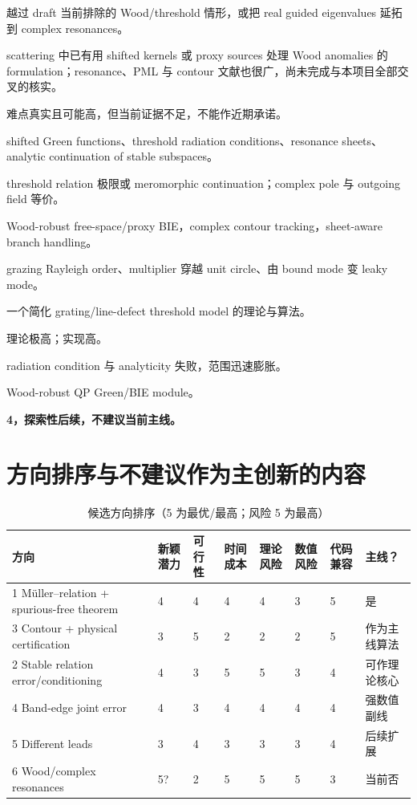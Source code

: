 \documentclass[UTF8,11pt,fontset=none]{ctexart}
\begin{document}
\begin{description}[style=multiline,leftmargin=4.4cm,labelwidth=4.1cm]
  \item[核心问题：] 越过 draft 当前排除的 Wood/threshold 情形，或把 real guided eigenvalues 延拓到 complex resonances。
  \item[差异：] scattering 中已有用 shifted kernels 或 proxy sources 处理 Wood anomalies 的 formulation；resonance、PML 与 contour 文献也很广，尚未完成与本项目全部交叉的核实。
  \item[创新性：] 难点真实且可能高，但当前证据不足，不能作近期承诺。
  \item[继续核实：] shifted Green functions、threshold radiation conditions、resonance sheets、analytic continuation of stable subspaces。
  \item[主要定理：] threshold relation 极限或 meromorphic continuation；complex pole 与 outgoing field 等价。
  \item[算法：] Wood-robust free-space/proxy BIE，complex contour tracking，sheet-aware branch handling。
  \item[实验：] grazing Rayleigh order、multiplier 穿越 unit circle、由 bound mode 变 leaky mode。
  \item[最小单元：] 一个简化 grating/line-defect threshold model 的理论与算法。
  \item[难度：] 理论极高；实现高。
  \item[风险：] radiation condition 与 analyticity 失败，范围迅速膨胀。
  \item[失败时保留：] Wood-robust QP Green/BIE module。
  \item[优先级：] \textbf{4，探索性后续，不建议当前主线。}
\end{description}

\section{方向排序与不建议作为主创新的内容}

\begin{table}[htbp]
\centering
\caption{候选方向排序（5 为最优/最高；风险 5 为最高）}
\small
\begin{tabularx}{\textwidth}{p{} C{1.15cm} C{1.15cm} C{1.15cm} C{1.15cm} C{1.15cm} C{1.35cm} Y}
\toprule
方向 & 新颖潜力 & 可行性 & 时间成本 & 理论风险 & 数值风险 & 代码兼容 & 主线？ \\
 Müller--relation + spurious-free theorem & 4 & 4 & 4 & 4 & 3 & 5 & 是 \\
3 Contour + physical certification & 3 & 5 & 2 & 2 & 2 & 5 & 作为主线算法 \\
2 Stable relation error/conditioning & 4 & 3 & 5 & 5 & 3 & 4 & 可作理论核心 \\
4 Band-edge joint error & 4 & 3 & 4 & 4 & 4 & 4 & 强数值副线 \\
5 Different leads & 3 & 4 & 3 & 3 & 3 & 4 & 后续扩展 \\
6 Wood/complex resonances & 5? & 2 & 5 & 5 & 5 & 3 & 当前否 \\
\bottomrule
\end{tabularx}
\end{table}
\end{document}
